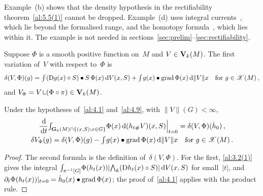\begin{remark}
    \label{rem:4.8}
    Example~(b) shows that the density hypothesis in the rectifiability theorem~\ref{al:5.5(1)}
    cannot be dropped. Example~(d) uses integral currents~\cite[4.2]{Federer1969}, which lie beyond the
    formalised range, and the homotopy formula~\cite[4.1.9]{Federer1969}, which lies within it.
    The example is not needed in sections~\ref{sec:prelim}--\ref{sec:rectifiability}.
\end{remark}

\begin{definition}
    \label{al:4.9}
    Suppose $\Phi$ is a smooth positive function on~$M$ and $V \in \mathbf{V}_{k}(M)$. The first
    variation of~$V$ with respect to~$\Phi$ is
    \begin{displaymath}
        \delta(V,\Phi)(g) = {\textstyle\int_{}^{}} (\mathrm{D} g(x) \circ S) \bullet S \, \Phi(x) \,\mathrm{d} V(x,S) +
        {\textstyle\int_{}^{}} g(x) \bullet \operatorname{grad} \Phi(x) \,\mathrm{d} \|V\| x \quad \text{for $g \in \mathscr{X}(M)$} \,,
    \end{displaymath}
    and $V_\Phi = V \restrict (\Phi \circ \pi) \in \Var{\vdim}(M)$.
\end{definition}

\begin{lemma}
    \label{al:4.9(1)}
    Under the hypotheses of~\ref{al:4.1} and~\ref{al:4.9}, with $\|V\|(G) < \infty$,
    \begin{gather*}
        \frac{\,\mathrm{d}}{\,\mathrm{d} t} {\textstyle\int_{\mathbf{G}_{k}(M) \cap \{ (x,S) : x \in G \}}^{}} \Phi(x) \,\mathrm{d} (h_{t \#}
        V)(x,S) \Big|_{t=0} = \delta(V,\Phi)(\dot h_0) \,, \\
        \delta V_\Phi(g) = \delta(V,\Phi)(g) - {\textstyle\int_{}^{}} g(x) \bullet \operatorname{grad} \Phi(x) \,\mathrm{d} \|V\| x
        \quad \text{for $g \in \mathscr{X}(M)$} \,.
    \end{gather*}
\end{lemma}

\begin{proof}
    The second formula is the definition of~$\delta(V,\Phi)$. For the first, \ref{al:3.2(1)} gives
    the integral ${\textstyle\int_{\pi^{-1}[G]}^{}} \Phi(h_t(x)) |{\textstyle\boldsymbol{\bigwedge}}_{{k}}(\mathrm{D} h_t(x) \circ S)| \,\mathrm{d}
    V(x,S)$ for small~$|t|$, and $\partial_t \Phi(h_t(x)) |_{t=0} = \dot h_0(x) \bullet \operatorname{grad}
    \Phi(x)$; the proof of~\ref{al:4.1} applies with the product rule.
\end{proof}

